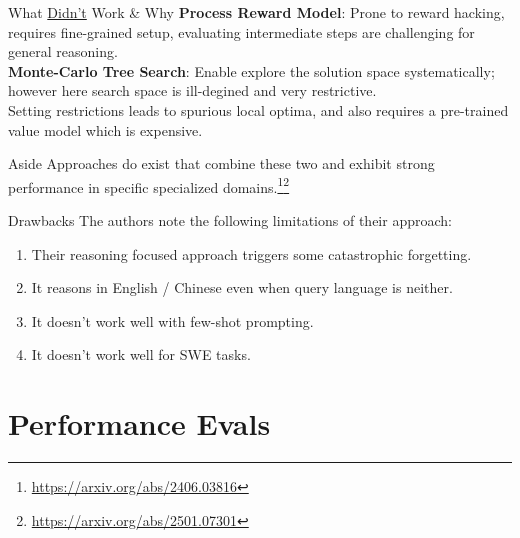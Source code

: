 \documentclass{beamer}
\begin{document}
{\let\oldfootnoterule\footnoterule
\def\footnoterule{\only<3->\oldfootnoterule}
\begin{frame}{What \underline{Didn't} Work \& Why}
	\textbf{Process Reward Model}: Prone to reward hacking, requires fine-grained setup, evaluating intermediate steps are challenging for general reasoning. \pause \newline \\

	\textbf{Monte-Carlo Tree Search}: Enable explore the solution space systematically; however here search space is ill-degined and very restrictive. \pause \newline \\
	Setting restrictions leads to spurious local optima, and also requires a pre-trained value model which is expensive. \pause \newline \\

	\begin{block}{Aside}
		Approaches do exist that combine these two and exhibit strong performance in specific specialized domains.\footnote<3->{\url{https://arxiv.org/abs/2406.03816}}\footnote<3->{\url{https://arxiv.org/abs/2501.07301}}
	\end{block}
\end{frame}
}

\begin{frame}{Drawbacks}
	The authors note the following limitations of their approach:
	\begin{enumerate}[label=\arabic*.]
		\item Their reasoning focused approach triggers some catastrophic forgetting. \pause \\
		\item It reasons in English / Chinese even when query language is neither. \pause \\
		\item It doesn't work well with few-shot prompting. \pause \\
		\item It doesn't work well for SWE tasks.
	\end{enumerate}
\end{frame}

\section{Performance Evals}
\end{document}

